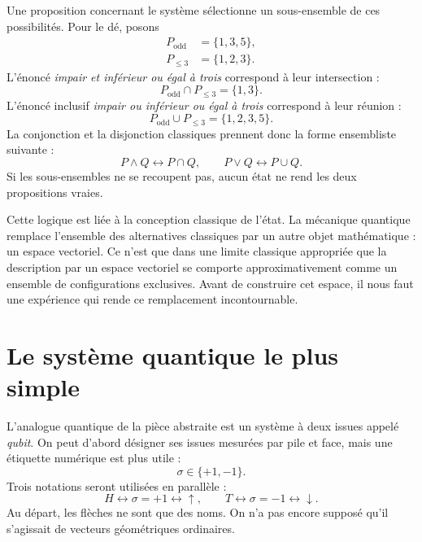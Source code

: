 Une proposition concernant le système sélectionne un sous-ensemble de ces possibilités. Pour le dé, posons
\begin{align}
  P_{\mathrm{odd}}&=\{1,3,5\},\\
  P_{\leq 3}&=\{1,2,3\}.
\end{align}
L’énoncé \emph{impair et inférieur ou égal à trois} correspond à leur intersection :
\begin{equation}
  P_{\mathrm{odd}}\cap P_{\leq 3}=\{1,3\}.
\end{equation}
L’énoncé inclusif \emph{impair ou inférieur ou égal à trois} correspond à leur réunion :
\begin{equation}
  P_{\mathrm{odd}}\cup P_{\leq 3}
  =
  \{1,2,3,5\}.
\end{equation}
La conjonction et la disjonction classiques prennent donc la forme ensembliste suivante :
\begin{equation}
  P\wedge Q\longleftrightarrow P\cap Q,
  \qquad
  P\vee Q\longleftrightarrow P\cup Q.
\end{equation}
Si les sous-ensembles ne se recoupent pas, aucun état ne rend les deux propositions vraies.

Cette logique est liée à la conception classique de l’état. La mécanique quantique remplace l’ensemble des alternatives classiques par un autre objet mathématique : un espace vectoriel. Ce n’est que dans une limite classique appropriée que la description par un espace vectoriel se comporte approximativement comme un ensemble de configurations exclusives. Avant de construire cet espace, il nous faut une expérience qui rende ce remplacement incontournable.

\section{Le système quantique le plus simple}

L’analogue quantique de la pièce abstraite est un système à deux issues appelé \emph{qubit}. On peut d’abord désigner ses issues mesurées par pile et face, mais une étiquette numérique est plus utile :
\begin{equation}
  \sigma\in\{+1,-1\}.
\end{equation}
Trois notations seront utilisées en parallèle :
\begin{equation}
  H\longleftrightarrow \sigma=+1\longleftrightarrow\uparrow,
  \qquad
  T\longleftrightarrow \sigma=-1\longleftrightarrow\downarrow.
\end{equation}
Au départ, les flèches ne sont que des noms. On n’a pas encore supposé qu’il s’agissait de vecteurs géométriques ordinaires.

